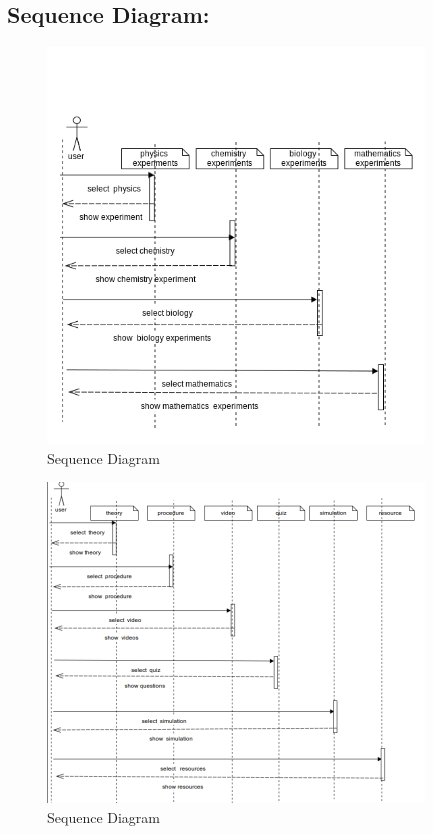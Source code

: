 \documentclass[12pt]{report}
\begin{document}
\subsection{Sequence Diagram:}

\begin{figure}[H]
 \centering
 \includegraphics[width=10cm]{./sequence_1.png}
 \caption{Sequence Diagram\label{fig:sequence_1}}
\end{figure}

\begin{figure}[H]
 \centering
 \includegraphics[width=10cm]{./sequence_2.png}
 \caption{Sequence Diagram\label{fig:sequence_2}}
\end{figure}
\end{document}
